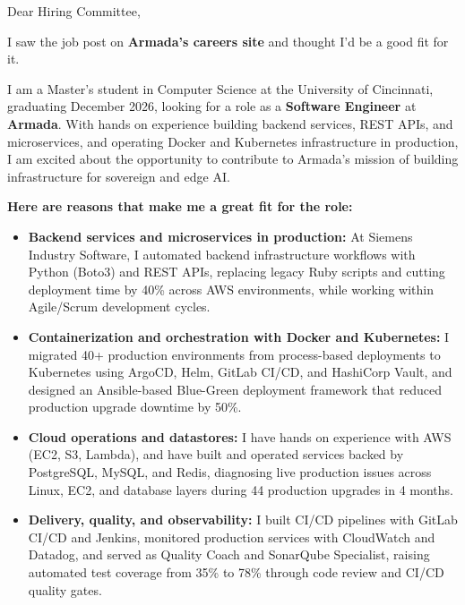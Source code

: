\documentclass[11pt]{letter}
\date{}
\begin{document}
\begin{letter}{}

\opening{Dear Hiring Committee,}

I saw the job post on \textbf{Armada's careers site} and thought I'd be a good fit for it.

I am a Master's student in Computer Science at the University of Cincinnati, graduating December 2026, looking for a role as a \textbf{Software Engineer} at \textbf{Armada}. With hands on experience building backend services, REST APIs, and microservices, and operating Docker and Kubernetes infrastructure in production, I am excited about the opportunity to contribute to Armada's mission of building infrastructure for sovereign and edge AI.

\textbf{Here are reasons that make me a great fit for the role:}

\begin{itemize}[leftmargin=*, itemsep=0.45em]
    \item \textbf{Backend services and microservices in production:} At Siemens Industry Software, I automated backend infrastructure workflows with Python (Boto3) and REST APIs, replacing legacy Ruby scripts and cutting deployment time by 40\% across AWS environments, while working within Agile/Scrum development cycles.

    \item \textbf{Containerization and orchestration with Docker and Kubernetes:} I migrated 40+ production environments from process-based deployments to Kubernetes using ArgoCD, Helm, GitLab CI/CD, and HashiCorp Vault, and designed an Ansible-based Blue-Green deployment framework that reduced production upgrade downtime by 50\%.

    \item \textbf{Cloud operations and datastores:} I have hands on experience with AWS (EC2, S3, Lambda), and have built and operated services backed by PostgreSQL, MySQL, and Redis, diagnosing live production issues across Linux, EC2, and database layers during 44 production upgrades in 4 months.

    \item \textbf{Delivery, quality, and observability:} I built CI/CD pipelines with GitLab CI/CD and Jenkins, monitored production services with CloudWatch and Datadog, and served as Quality Coach and SonarQube Specialist, raising automated test coverage from 35\% to 78\% through code review and CI/CD quality gates.
\end{itemize}


\end{letter}
\end{document}
